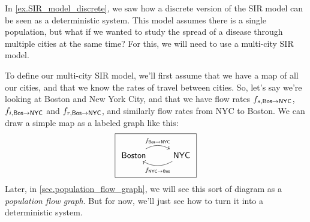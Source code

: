 \documentclass[DynamicalBook]{subfiles}
\begin{document}
\iffalse
\begin{example}\label{ex.multi_city_SIR_discrete}
  
  In \cref{ex.SIR_model_discrete}, we saw how a discrete version of the SIR
  model can be seen as a deterministic system. This model assumes there is a
  single population, but what if we wanted to study the spread of a disease
  through multiple cities at the same time? For this, we will need to use a
  multi-city SIR model.

  To define our multi-city SIR model, we'll first assume that we have a map of
  all our cities, and that we know the rates of travel between cities. So, let's
  say we're looking at Boston and New York City, and that we have flow rates
  $f_{s,\mathsf{Bos}\to \mathsf{NYC}}$, $f_{i,\mathsf{Bos}\to \mathsf{NYC}}$ and
  $f_{r,\mathsf{Bos}\to \mathsf{NYC}}$, and similarly flow rates from NYC to Boston.
  We can draw a simple map as a labeled graph like this:
  \[
\begin{tikzpicture}
	\node[draw] {
  \begin{tikzcd}
    \Sys{Boston} \ar[r, bend left, "f_{\Sys{Bos} \to \Sys{NYC}}"]\ar[r, bend right, leftarrow, "f_{\Sys{NYC} \to \Sys{Bos}}"'] & \Sys{NYC}
  \end{tikzcd}
  };
\end{tikzpicture}
  \]
  Later, in \cref{sec.population_flow_graph}, we will see this sort of diagram
  as a \emph{population flow graph}. But for now, we'll just see how to turn it
  into a deterministic system.
  

\end{example}
\end{document}
